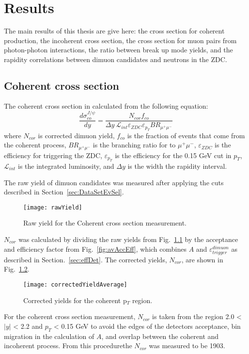 
\chapter{Results} 
  The main results of this thesis are give here:
    the cross section for coherent \JPsi production, the incoherent \JPsi cross
    section, the cross section for muon pairs from photon-photon interactions,
    the ratio between break up mode yields, and the rapidity correlations 
    between dimuon candidates and neutrons in the ZDC.

  \section{Coherent cross section}
  The coherent cross section in calculated from the following equation:
  \begin{equation}
    \frac{d\sigma^{J/\psi}_{co}}{dy}  = \frac{N_{cor} f_{co}  }
    { \Delta y~\mathcal{L}_{int} \varepsilon_{ZDC} \varepsilon_{p_{T}} 
      BR_{\mu^{+}\mu^{-}}}
    \label{eq:expXSecCo}
   \end{equation}
   where $N_{cor}$ is corrected dimuon yield, $f_{co}$ is the 
     fraction of events that come from the coherent process, 
     $BR_{\mu^{+}\mu^{-}}$ is the branching ratio for \JPsi to $\mu^{+}\mu^{-}$, 
     $\varepsilon_{ZDC}$ is the efficiency for triggering the ZDC, 
     $\varepsilon_{p_{T}}$ is the efficiency for the 0.15 GeV cut in $p_{T}$, 
     $\mathcal{L}_{int}$ is the integrated luminosity, and $\Delta y$ is the 
     width the rapidity interval.

  The raw yield of dimuon candidates was measured after applying the cuts 
    described in Section~\ref{sec:DataSetEvSel}.
  \begin{figure}[!Hhtb]
    \centering
    \texttt{[image: rawYield]}
    \caption{Raw yield for the Coherent cross section measurement.}
    \label{fig:rawYieldCo}
  \end{figure}
  $N_{cor}$ was calculated by dividing the raw yields from 
    Fig.~\ref{fig:rawYieldCo} by the acceptance and efficiency factor from 
    Fig.~\ref{fig:avAccEff}, which combines $A$ and 
    $\varepsilon^{dimuon}_{trigger}$ as described in Section.~\ref{sec:effDet}.
  The corrected yields, $N_{cor}$, are shown in Fig.~\ref{fig:corYieldCo}.
  \begin{figure}[!Hhtb]
    \centering
    \texttt{[image: correctedYieldAverage]}
    \caption{Corrected yields for the coherent p$_{T}$ region.}
    \label{fig:corYieldCo}
  \end{figure}
  For the coherent cross section measurement, $N_{cor}$ is taken from the 
    region 2.0 < $|y|$ < 2.2 and $p_{T}$ < 0.15 GeV to avoid the edges of the
    detectors acceptance, bin migration in the calculation of $A$, and overlap
    between the coherent and incoherent process.
  From this procedure\DIFaddbegin \DIFadd{, }\DIFaddend the $N_{cor}$ was measured to be 1903.

